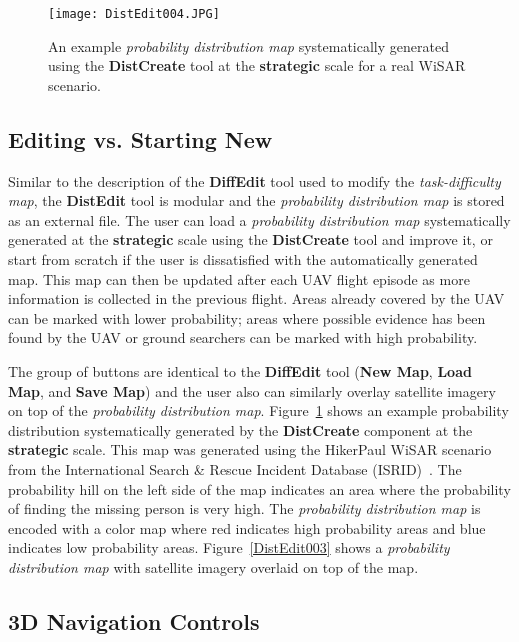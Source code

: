 \begin{figure}
\centering
\texttt{[image: DistEdit004.JPG]}
\caption{An example \textit{probability distribution map} systematically generated using the \textbf{DistCreate} tool at the \textbf{strategic} scale for a real WiSAR scenario.}
\label{DistEdit004}
\end{figure}

\subsection{Editing vs. Starting New}

Similar to the description of the \textbf{DiffEdit} tool used to modify the \textit{task-difficulty map}, the \textbf{DistEdit} tool is modular and the \textit{probability distribution map} is stored as an external file. The user can load a \textit{probability distribution map} systematically generated at the \textbf{strategic} scale using the \textbf{DistCreate} tool and improve it, or start from scratch if the user is dissatisfied with the automatically generated map. This map can then be updated after each UAV flight episode as more information is collected in the previous flight. Areas already covered by the UAV can be marked with lower probability; areas where possible evidence has been found by the UAV or ground searchers can be marked with high probability. 

The group of buttons are identical to the \textbf{DiffEdit} tool (\textbf{New Map}, \textbf{Load Map}, and \textbf{Save Map}) and the user also can similarly overlay satellite imagery on top of the \textit{probability distribution map}. Figure~\ref{DistEdit004} shows an example probability distribution systematically generated by the \textbf{DistCreate} component at the \textbf{strategic} scale. This map was generated using the HikerPaul WiSAR scenario~\cite{Lin2014Hierarchical} from the International Search \& Rescue Incident Database (ISRID)~\cite{Koester2008Lost}. The probability hill on the left side of the map indicates an area where the probability of finding the missing person is very high. The \textit{probability distribution map} is encoded with a color map where red indicates high probability areas and blue indicates low probability areas. Figure~\ref{DistEdit003} shows a \textit{probability distribution map} with satellite imagery overlaid on top of the map.

\subsection{3D Navigation Controls}


